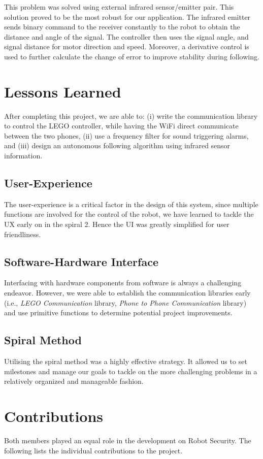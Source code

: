 \documentclass[12pt]{article}
\begin{document}
This problem was solved using external infrared sensor/emitter pair. This solution proved to be the most robust for our application. The infrared emitter sends binary command to the receiver constantly to the robot to obtain the distance and angle of the signal. The controller then uses the signal angle, and signal distance for motor direction and speed. Moreover, a derivative control is used to further calculate the change of error to improve stability during following.

\section{Lessons Learned}
After completing this project, we are able to: (i) write the communication library to control the LEGO controller, while having the WiFi direct communicate between the two phones, (ii) use a frequency filter for sound triggering alarms, and (iii) design an autonomous following algorithm using infrared sensor information.
\subsection{User-Experience}
The user-experience is a critical factor in the design of this system, since multiple functions are involved for the control of the robot, we have learned to tackle the UX early on in the spiral 2. Hence the UI was greatly simplified for user friendliness.

\subsection{Software-Hardware Interface}
Interfacing with hardware components from software is always a challenging endeavor. However, we were able to establish the communication libraries early (i.e., \textit{LEGO Communication} library, \textit{Phone to Phone Communication} library) and use primitive functions to determine potential project improvements.

\subsection{Spiral Method} 
Utilising the spiral method was a highly effective strategy. It allowed us to set milestones and manage our goals to tackle on the more challenging problems in a relatively organized and manageable fashion.

\section{Contributions}
Both members played an equal role in the development on Robot Security. The following lists the individual contributions to the project.
\end{document}
